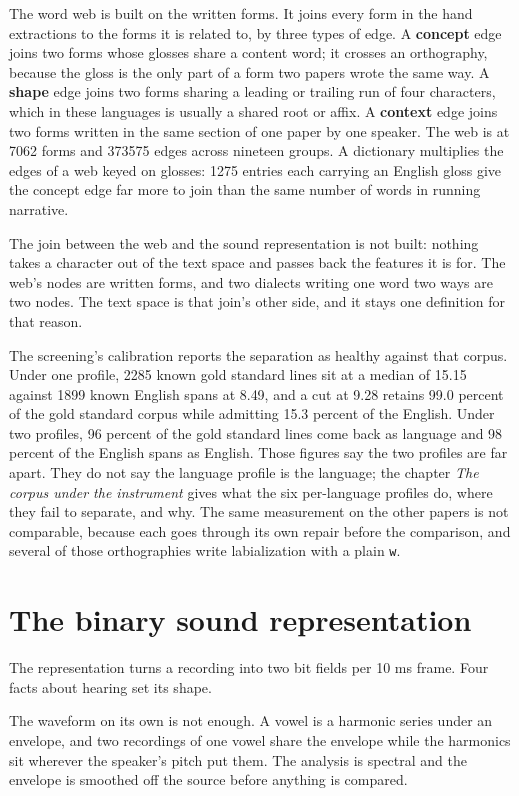 The word web is built on the written forms. It joins every form in the hand extractions to the forms it is related to, by three types of edge. A \textbf{concept} edge joins two forms whose glosses share a content word; it crosses an orthography, because the gloss is the only part of a form two papers wrote the same way. A \textbf{shape} edge joins two forms sharing a leading or trailing run of four characters, which in these languages is usually a shared root or affix. A \textbf{context} edge joins two forms written in the same section of one paper by one speaker. The web is at 7062 forms and 373575 edges across nineteen groups. A dictionary multiplies the edges of a web keyed on glosses: 1275 entries each carrying an English gloss give the concept edge far more to join than the same number of words in running narrative.

The join between the web and the sound representation is not built: nothing takes a character out of the text space and passes back the features it is for. The web's nodes are written forms, and two dialects writing one word two ways are two nodes. The text space is that join's other side, and it stays one definition for that reason.

The screening's calibration reports the separation as healthy against that corpus. Under one profile, 2285 known gold standard lines sit at a median of 15.15 against 1899 known English spans at 8.49, and a cut at 9.28 retains 99.0 percent of the gold standard corpus while admitting 15.3 percent of the English. Under two profiles, 96 percent of the gold standard lines come back as language and 98 percent of the English spans as English. Those figures say the two profiles are far apart. They do not say the language profile is the language; the chapter \emph{The corpus under the instrument} gives what the six per-language profiles do, where they fail to separate, and why. The same measurement on the other papers is not comparable, because each goes through its own repair before the comparison, and several of those orthographies write labialization with a plain \texttt{w}.

\section{The binary sound representation}

The representation turns a recording into two bit fields per 10 ms frame. Four facts about hearing set its shape.

The waveform on its own is not enough. A vowel is a harmonic series under an envelope, and two recordings of one vowel share the envelope while the harmonics sit wherever the speaker's pitch put them. The analysis is spectral and the envelope is smoothed off the source before anything is compared.

